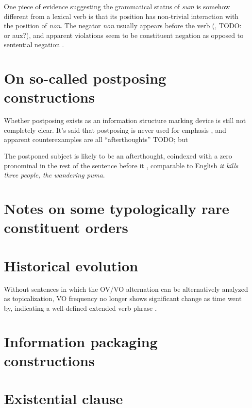 \documentclass[a4paper, oneside, 12pt]{report}
\newcommand*{\citesec}[1]{\S~{#1}}
\newcommand*{\citepage}[1]{p.~{#1}}
\newcommand{\form}[1]{\emph{#1}}
\begin{document}
One piece of evidence suggesting the grammatical status of \form{sum} 
is somehow different from a lexical verb 
is that its position has non-trivial interaction 
with the position of \form{non}.
The negator \form{non} usually appears before the verb 
(\citealt[\citesec{1.5}]{danckaert2017development}, TODO: or aux?),
and apparent violations seem to be constituent negation 
as opposed to sentential negation \citep[\citepage{43}]{danckaert2017development}.

\section{On so-called postposing constructions}\label{sec:clause-order.postpone}

Whether postposing exists as an information structure marking device 
is still not completely clear. 
It's said that postposing is never used for emphasis \citep[\citepage{395}]{allen1903allen},
and apparent counterexamples are all ``afterthoughts'' TODO;
but 

The postponed subject is likely to be an afterthought, 
coindexed with a zero pronominal 
in the rest of the sentence before it
\citet[\citepage{87}]{devine2006latin},
comparable to English \form{it kills three people, the wandering puma}.

\section{Notes on some typologically rare constituent orders}


\section{Historical evolution}\label{sec:constituent-order.history}

Without sentences in which the OV/VO alternation 
can be alternatively analyzed as topicalization,
VO frequency no longer shows significant change as time went by,
indicating a well-defined extended verb phrase \citep[\citesec{1.5}, \citepage{29}]{danckaert2017development}.

\section{Information packaging constructions}

\section{Existential clause}\label{sec:clause.exist}
\end{document}
